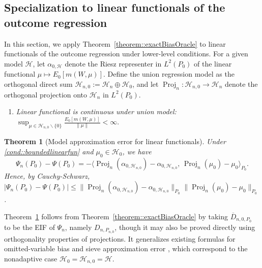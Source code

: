 \documentclass[11pt]{article}
\newtheorem{theorem}{Theorem}
\theoremstyle{definition}
\begin{document}
 
\subsection{Specialization to linear functionals of the outcome regression}

\label{adml::modelselectlinearfunc}

In this section, we apply Theorem~\ref{theorem::exactBiasOracle} to linear functionals of the outcome regression under lower-level conditions. For a given model \(\mathcal{H}\), let \(\alpha_{0,\mathcal{H}}\) denote the Riesz representer in \(L^2(P_0)\) of the linear functional \(\mu \mapsto E_0[m(W,\mu)]\). Define the union regression model as the orthogonal direct sum \(\mathcal{H}_{n,0} := \mathcal{H}_n \oplus \mathcal{H}_0\), and let \(\operatorname{Proj}_n : \mathcal{H}_{n,0} \to \mathcal{H}_n\) denote the orthogonal projection onto \(\mathcal{H}_n\) in \(L^2(P_0)\).



\begin{enumerate}[label=(B\arabic*), ref=B\arabic*,resume=condlinear]
\item  \textit{Linear functional is continuous under union model:} \label{cond::boundedlinearfun} $\sup_{\mu \in \mathcal{H}_{n,0} \backslash \{0\} } \frac{E_0[m(W,\mu)]}{\|\mu\|} < \infty$.
\end{enumerate}

 
\begin{theorem}[Model approximation error for linear functionals]
\label{theorem::oraclebiaslinear}
    Under \ref{cond::boundedlinearfun} and $\mu_0 \in \mathcal{H}_0$, we have 
    $$\Psi_n(P_0) - \Psi(P_0) = - \langle \operatorname{Proj}_n(\alpha_{0,\mathcal{H}_{n,0}}) - \alpha_{0, \mathcal{H}_{n,0}},\, \operatorname{Proj}_n(\mu_{0}) - \mu_0  \rangle_{P_0}.$$
    Hence, by Cauchy-Schwarz, $|\Psi_n(P_0) - \Psi(P_0)| \leq \|\operatorname{Proj}_n (\alpha_{0,\mathcal{H}_{n,0}})  - \alpha_{0,\mathcal{H}_{n,0}}\|_{P_0} \|  \operatorname{Proj}_n(\mu_0) - \mu_0 \|_{P_0}$.
\end{theorem}
Theorem~\ref{theorem::oraclebiaslinear} follows from Theorem~\ref{theorem::exactBiasOracle} by taking \(\overline{D}_{n,0,P_0}\) to be the EIF of \(\Psi_n\), namely \(D_{n,P_{n,0}}\), though it may also be proved directly using orthogonality properties of projections. It generalizes existing formulas for omitted-variable bias \citep{chernozhukov2021long} and sieve approximation error \citep{shen1997methods, sieveOneStepPlugin, spnpsieve}, which correspond to the nonadaptive case \(\mathcal{H}_0 = \mathcal{H}_{n,0}= \mathcal{H}\).
\end{document}
